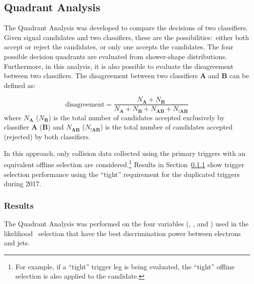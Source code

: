 \subsection{Quadrant Analysis}\label{ssec:quadrant}

The Quadrant Analysis was developed to compare the decisions of two classifiers. Given signal candidates and two classifiers, these are the possibilities:\ either both accept or reject the candidates, or only one accepts the candidates. The four possible decision quadrants are evaluated from shower-shape distributions. Furthermore, in this analysis, it is also possible to evaluate the disagreement between two classifiers. The disagreement between two classifiers $\textbf{A}$ and $\textbf{B}$ can be defined as:

\begin{equation}
    \text{disagreement} = \frac{N_{\textbf{A}}+N_{\textbf{B}}}{N_{\textbf{A}}+N_{\textbf{B}}+N_{\textbf{AB}}+N_{!\textbf{AB}}}
    \label{eq:disagreement}
\end{equation}
where $N_{\textbf{A}}$ ($N_{\textbf{B}}$) is the total number of candidates accepted exclusively by classifier $\textbf{A}$ ($\textbf{B}$) and $N_{\textbf{AB}}$ ($N_{\textbf{!AB}}$) is the total number of candidates accepted (rejected) by both classifiers.

In this approach, only collision data collected using the primary triggers with an equivalent offline selection are considered.\footnote{For example, if a \enquote{tight} trigger leg is being evaluated, the \enquote{tight} offline selection is also applied to the candidate.}
Results in Section~\ref{top:quadrant_results} show
trigger selection performance using the \enquote{tight} requirement for the duplicated triggers during 2017.

\subsubsection{Results}\label{top:quadrant_results}

The Quadrant Analysis was performed on the four variables (\reta{}, \rphi{}, \eratio{} and \rhad{}) used in the likelihood~\cite{PERF-2017-01} selection that have the best discrimination power between electrons and jets. 

